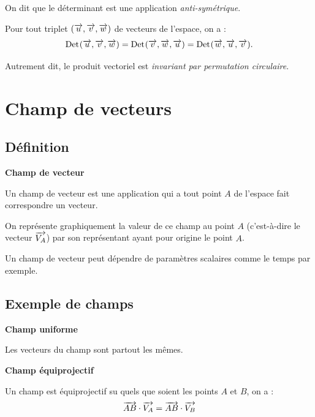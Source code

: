 \documentclass[10pt,oneside]{article}
\newcommand{\Det}{\mathrm{Det}\hspace{.2mm}}
\begin{document}
\begin{rem}

On dit que le déterminant est une application \emph{anti-symétrique}.
\end{rem}

\begin{coro}
Pour tout triplet $(\overrightarrow{u}, \overrightarrow{v}, \overrightarrow{w})$ de vecteurs de l'espace, on a :
$$\Det(\vect{u},\vect{v}, \vect{w})=\Det(\vect{v},\vect{w}, \vect{u})=\Det(\vect{w},\vect{u}, \vect{v}).$$

Autrement dit, le produit vectoriel est \emph{invariant par permutation circulaire}.\\
\end{coro}


\section{Champ de vecteurs}
\subsection{Définition}
\begin{defi}
\textbf{Champ de vecteur}

Un champ de vecteur est une application qui a tout point $A$ de l'espace fait correspondre un vecteur. 
\end{defi}

On représente graphiquement la valeur de ce champ au point 
$A$ (c'est-à-dire le vecteur $\overrightarrow{V_A}$) par son représentant ayant pour origine le point $A$. 

Un champ de vecteur peut dépendre de paramètres scalaires comme le temps par exemple. 

\subsection{Exemple de champs}

\begin{defi}
\textbf{Champ uniforme}

Les vecteurs du champ sont partout les mêmes. 

\end{defi}

\begin{defi}
\textbf{Champ équiprojectif}

Un champ est équiprojectif su quels que soient les points $A$ et $B$, on a : 
$$
\overrightarrow{AB}\cdot \overrightarrow{V_A} = \overrightarrow{AB}\cdot \overrightarrow{V_B} 
$$

\end{defi}
\end{document}

